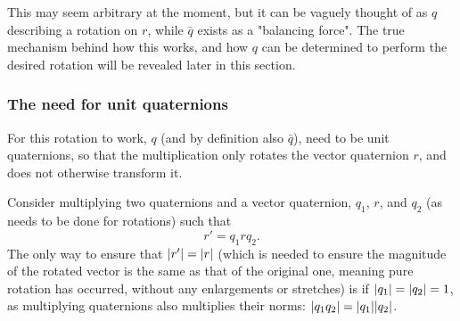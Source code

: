 \documentclass[10pt]{article}
\begin{document}
This may seem arbitrary at the moment, but it can be vaguely thought of as $q$ describing a rotation on $r$, while $\bar{q}$ exists as a "balancing force". The true mechanism behind how this works, and how $q$ can be determined to perform the desired rotation will be revealed later in this section.

\subsubsection{The need for unit quaternions} \label{NormMultProof}

For this rotation to work, $q$ (and by definition also $\bar{q}$), need to be unit quaternions, so that the multiplication only rotates the vector quaternion $r$, and does not otherwise transform it.

Consider multiplying two quaternions and a vector quaternion, $q_1$, $r$, and $q_2$ (as needs to be done for rotations) such that
\begin{equation}
    r' = q_1rq_2.
\end{equation}
The only way to ensure that $\abs{r'} = \abs{r}$ (which is needed to ensure the magnitude of the rotated vector is the same as that of the original one, meaning pure rotation has occurred, without any enlargements or stretches) is if $\abs{q_1} = \abs{q_2} = 1$, as multiplying quaternions also multiplies their norms: $\abs{q_1q_2} = \abs{q_1}\abs{q_2}$. \cite{Math431}
\end{document}
